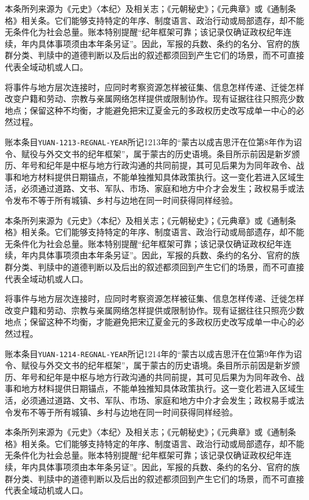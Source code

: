 本条所列来源为《元史》〈本纪〉及相关志；《元朝秘史》；《元典章》或《通制条格》相关条。它们能够支持特定的年序、制度语言、政治行动或局部遗存，却不能无条件化为社会总量。账本特别提醒“纪年框架可靠；该记录仅确证政权纪年连续，年内具体事项须由本年条另证”。因此，军报的兵数、条约的名分、官府的族群分类、判牍中的道德判断以及后出的叙述都须回到产生它们的场景，而不可直接代表全域动机或人口。

将事件与地方层次连接时，应同时考察资源怎样被征集、信息怎样传递、迁徙怎样改变户籍和劳动、宗教与亲属网络怎样提供或限制协作。现有证据往往只照亮少数地点；保留这种不均衡，才能避免把宋辽夏金元的多政权历史改写成单一中心的必然过程。

账本条目\texttt{YUAN-1213-REGNAL-YEAR}所记1213年的“蒙古以成吉思汗在位第8年作为诏令、赋役与外交文书的纪年框架”，属于蒙古的历史语境。条目所示前因是新岁颁历、年号和纪年是中枢与地方行政沟通的共同前提，其可见后果为为同年政令、战事和地方材料提供日期锚点，不能单独推知具体政策执行。这一变化若进入区域生活，必须通过道路、文书、军队、市场、家庭和地方中介才会发生；政权易手或法令发布不等于所有城镇、乡村与边地在同一时间获得同样经验。

本条所列来源为《元史》〈本纪〉及相关志；《元朝秘史》；《元典章》或《通制条格》相关条。它们能够支持特定的年序、制度语言、政治行动或局部遗存，却不能无条件化为社会总量。账本特别提醒“纪年框架可靠；该记录仅确证政权纪年连续，年内具体事项须由本年条另证”。因此，军报的兵数、条约的名分、官府的族群分类、判牍中的道德判断以及后出的叙述都须回到产生它们的场景，而不可直接代表全域动机或人口。

将事件与地方层次连接时，应同时考察资源怎样被征集、信息怎样传递、迁徙怎样改变户籍和劳动、宗教与亲属网络怎样提供或限制协作。现有证据往往只照亮少数地点；保留这种不均衡，才能避免把宋辽夏金元的多政权历史改写成单一中心的必然过程。

账本条目\texttt{YUAN-1214-REGNAL-YEAR}所记1214年的“蒙古以成吉思汗在位第9年作为诏令、赋役与外交文书的纪年框架”，属于蒙古的历史语境。条目所示前因是新岁颁历、年号和纪年是中枢与地方行政沟通的共同前提，其可见后果为为同年政令、战事和地方材料提供日期锚点，不能单独推知具体政策执行。这一变化若进入区域生活，必须通过道路、文书、军队、市场、家庭和地方中介才会发生；政权易手或法令发布不等于所有城镇、乡村与边地在同一时间获得同样经验。

本条所列来源为《元史》〈本纪〉及相关志；《元朝秘史》；《元典章》或《通制条格》相关条。它们能够支持特定的年序、制度语言、政治行动或局部遗存，却不能无条件化为社会总量。账本特别提醒“纪年框架可靠；该记录仅确证政权纪年连续，年内具体事项须由本年条另证”。因此，军报的兵数、条约的名分、官府的族群分类、判牍中的道德判断以及后出的叙述都须回到产生它们的场景，而不可直接代表全域动机或人口。

